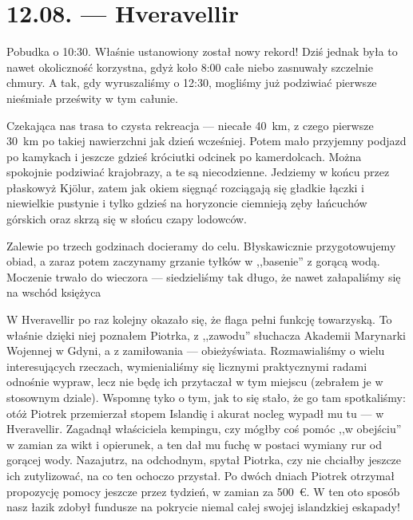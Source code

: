 \chapter*{12.08. --- Hveravellir}

Pobudka o 10:30. Właśnie ustanowiony został nowy rekord! Dziś jednak była to nawet okoliczność korzystna, gdyż koło 8:00 całe niebo zasnuwały szczelnie chmury. A tak, gdy wyruszaliśmy o 12:30, mogliśmy już podziwiać pierwsze nieśmiałe prześwity w tym całunie.

Czekająca nas trasa to czysta rekreacja --- niecałe 40~km, z czego pierwsze 30~km po takiej nawierzchni jak dzień wcześniej. Potem mało przyjemny podjazd po kamykach i jeszcze gdzieś króciutki odcinek po kamerdolcach. Można spokojnie podziwiać krajobrazy, a te są niecodzienne. Jedziemy w końcu przez płaskowyż Kjölur, zatem jak okiem sięgnąć rozciągają się gładkie łączki i niewielkie pustynie i tylko gdzieś na horyzoncie ciemnieją zęby łańcuchów górskich oraz skrzą się w słońcu czapy lodowców.

Zalewie po trzech godzinach docieramy do celu. Błyskawicznie przygotowujemy obiad, a zaraz potem  zaczynamy grzanie tyłków w ,,basenie'' z gorącą wodą. Moczenie trwało do wieczora --- siedzieliśmy tak długo, że nawet załapaliśmy się na wschód księżyca\textellipsis

W Hveravellir po raz kolejny okazało się, że flaga pełni funkcję towarzyską. To właśnie dzięki niej poznałem Piotrka, z ,,zawodu'' słuchacza Akademii Marynarki Wojennej w Gdyni, a z zamiłowania --- obieżyświata. Rozmawialiśmy o wielu interesujących rzeczach, wymienialiśmy się licznymi praktycznymi radami odnośnie wypraw, lecz nie będę ich przytaczał w tym miejscu (zebrałem je w stosownym dziale). Wspomnę tyko o tym, jak to się stało, że go tam spotkaliśmy: otóż Piotrek przemierzał stopem Islandię i akurat nocleg wypadł mu tu --- w Hveravellir. Zagadnął właściciela kempingu, czy mógłby coś pomóc ,,w obejściu'' w zamian za wikt i opierunek, a ten dał mu fuchę w postaci wymiany rur od gorącej wody. Nazajutrz, na odchodnym, spytał Piotrka, czy nie chciałby jeszcze ich zutylizować, na co ten ochoczo przystał. Po dwóch dniach Piotrek otrzymał propozycję pomocy jeszcze przez tydzień, w zamian za 500~€. W ten oto sposób nasz łazik zdobył fundusze na pokrycie niemal całej swojej islandzkiej eskapady!


